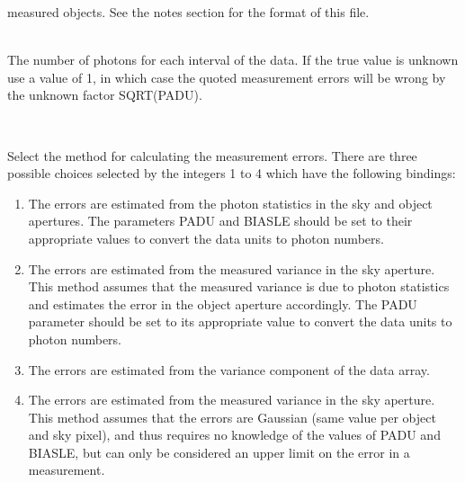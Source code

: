 \documentclass[twoside,11pt]{article}
\renewcommand{\_}{\texttt{\symbol{95}}}
\newcommand{\sstsubsection}[1]{ \item[{#1}] \mbox{} \\}
\newcommand{\sstsubsection}[1]{\item[{#1}]}
\begin{document}
{{{         measured objects. See the notes section for the format of this
         file.
      }
      \sstsubsection{
         PADU = \_REAL (Read)
      }{
         The number of photons for each interval of the data. If the
         true value is unknown use a value of 1, in which case the
         quoted measurement errors will be wrong by the unknown factor
         SQRT(PADU).
      }
      \sstsubsection{
         PHOTON = \_INTEGER (Read)
      }{
         Select the method for calculating the measurement errors.
         There are three possible choices selected by the integers 1 to 4
         which have the following bindings:
         \begin{enumerate}
         \item The errors are estimated from the photon statistics in the
             sky and object apertures. The parameters PADU and BIASLE
             should be set to their appropriate values to convert the
             data units to photon numbers.
         \item The errors are estimated from the measured variance in the
             sky aperture. This method assumes that the measured variance
             is due to photon statistics and estimates the error in the
             object aperture accordingly. The PADU parameter should be
             set to its appropriate value to convert the data units to
             photon numbers.
         \item The errors are estimated from the variance component of the
              data array.
         \item The errors are estimated from the measured variance in the
               sky aperture. This method assumes that the errors are Gaussian
               (same value per object and sky pixel), and thus requires no
               knowledge of the values of PADU and BIASLE, but can only be
               considered an upper limit on the error in a measurement.


\end{enumerate}}}}
\end{document}
